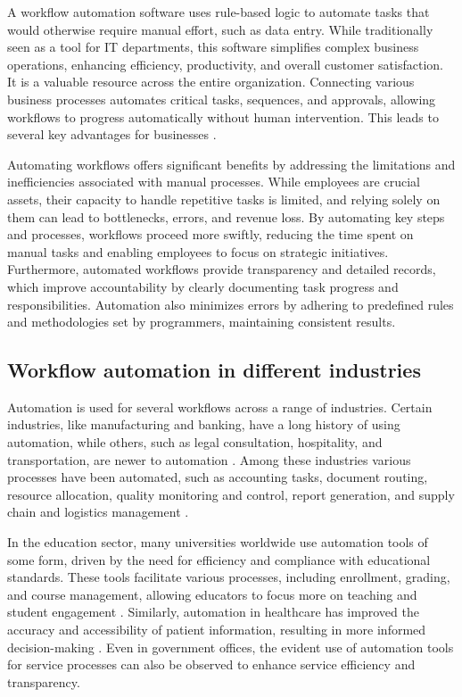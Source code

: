A workflow automation software uses rule-based logic to automate tasks that would otherwise require manual effort, such as data entry. While traditionally seen as a tool for IT departments, this software simplifies complex business operations, enhancing efficiency, productivity, and overall customer satisfaction. It is a valuable resource across the entire organization. Connecting various business processes automates critical tasks, sequences, and approvals, allowing workflows to progress automatically without human intervention. This leads to several key advantages for businesses \cite{servicenow}.

Automating workflows offers significant benefits by addressing the limitations and inefficiencies associated with manual processes. While employees are crucial assets, their capacity to handle repetitive tasks is limited, and relying solely on them can lead to bottlenecks, errors, and revenue loss. By automating key steps and processes, workflows proceed more swiftly, reducing the time spent on manual tasks and enabling employees to focus on strategic initiatives. Furthermore, automated workflows provide transparency and detailed records, which improve accountability by clearly documenting task progress and responsibilities. Automation also minimizes errors by adhering to predefined rules and methodologies set by programmers, maintaining consistent results.

\subsection{Workflow automation in different industries}

Automation is used for several workflows across a range of industries. Certain industries, like manufacturing and banking, have a long history of using automation, while others, such as legal consultation, hospitality, and transportation, are newer to automation \cite{caban2021}. Among these industries various processes have been automated, such as accounting tasks, document routing, resource allocation, quality monitoring and control, report generation, and supply chain and logistics management \cite{aguirre2017, mcquilken2014}.

In the education sector, many universities worldwide use automation tools of some form, driven by the need for efficiency and compliance with educational standards. These tools facilitate various processes, including enrollment, grading, and course management, allowing educators to focus more on teaching and student engagement \cite{choudhary2024}. Similarly, automation in healthcare has improved the accuracy and accessibility of patient information, resulting in more informed decision-making \cite{gupta2020}. Even in government offices, the evident use of automation tools for service processes can also be observed to enhance service efficiency and transparency. 

